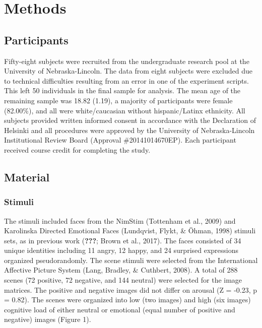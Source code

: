 \documentclass[man]{apa6}
\begin{document}
\hypertarget{methods}{%
\section{Methods}\label{methods}}

\hypertarget{participants}{%
\subsection{Participants}\label{participants}}

Fifty-eight subjects were recruited from the undergraduate research pool at the University of Nebraska-Lincoln. The data from eight subjects were excluded due to technical difficulties resulting from an error in one of the experiment scripts. This left 50 individuals in the final sample for analysis. The mean age of the remaining sample was 18.82 (1.19), a majority of participants were female (82.00\%), and all were white/caucasian without hispanic/Latinx ethnicity. All subjects provided written informed consent in accordance with the Declaration of Helsinki and all procedures were approved by the University of Nebraska-Lincoln Institutional Review Board (Approval \#20141014670EP). Each participant received course credit for completing the study.

\hypertarget{material}{%
\subsection{Material}\label{material}}

\hypertarget{stimuli}{%
\subsubsection{Stimuli}\label{stimuli}}

The stimuli included faces from the NimStim (Tottenham et al., 2009) and Karolinska Directed Emotional Faces (Lundqvist, Flykt, \& Öhman, 1998) stimuli sets, as in previous work ({\textbf{???}}; Brown et al., 2017). The faces consisted of 34 unique identities including 11 angry, 12 happy, and 24 surprised expressions organized pseudorandomly. The scene stimuli were selected from the International Affective Picture System (Lang, Bradley, \& Cuthbert, 2008). A total of 288 scenes (72 positive, 72 negative, and 144 neutral) were selected for the image matrices. The positive and negative images did not differ on arousal (Z = -0.23, p = 0.82). The scenes were organized into low (two images) and high (six images) cognitive load of either neutral or emotional (equal number of positive and negative) images (Figure 1).
\end{document}
